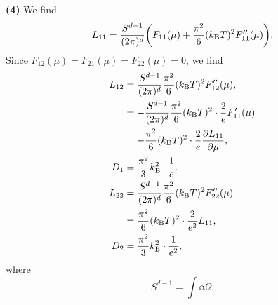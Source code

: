 \documentclass{article}
\makeatletter
\newcommand*{\shifttext}[1]{%
  \settowidth{\@tempdima}{#1}%
  \hspace{-\@tempdima}#1%
}
\newcommand{\plabel}[1]{%
\shifttext{\textbf{#1}\quad}%
}
\makeatother
\begin{document}
\plabel{(4)}%
We find
\[ L_{11} = \frac{S^{d-1}}{(2\pi)^d} \qty(F_{11}(\mu) + \frac{\pi^2}{6}(k_{\mathrm{B}} T)^2 F''_{11}(\mu)). \]
Since $F_{12}(\mu) = F_{21}(\mu) = F_{22}(\mu) = 0$, we find
\begin{align*}
  L_{12} &= \frac{S^{d-1}}{(2\pi)^d} \frac{\pi^2}{6}(k_{\mathrm{B}}T)^2 F''_{12}(\mu), \\
  &= -\frac{S^{d-1}}{(2\pi)^d} \frac{\pi^2}{6}(k_{\mathrm{B}}T)^2 \cdot \frac{2}{e} F'_{11}(\mu) \\
  &= -\frac{\pi^2}{6}(k_{\mathrm{B}}T)^2 \cdot \frac{2}{e} \pdv{L_{11}}{\mu}, \\
  D_1 &= \frac{\pi^2}{3}k_{\mathrm{B}}^2 \cdot \frac{1}{e}. \\
  L_{22} &= \frac{S^{d-1}}{(2\pi)^d} \frac{\pi^2}{6}(k_{\mathrm{B}}T)^2 F''_{22}(\mu) \\
  &= \frac{\pi^2}{6}(k_{\mathrm{B}}T)^2 \cdot \frac{2}{e^2} L_{11}, \\
  D_2 &= \frac{\pi^2}{3} k_{\mathrm{B}}^2 \cdot \frac{1}{e^2},
\end{align*}
where
\[ S^{d-1} = \int \dd{\Omega}. \]

% 
% 
\end{document}

